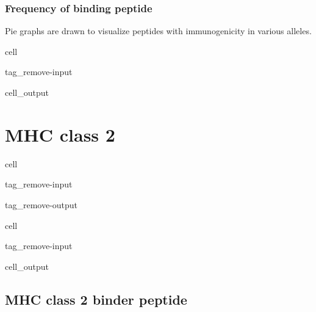 \documentclass[letterpaper,10pt,english]{jupyterBook}
\begin{document}
\subsubsection{Frequency of binding peptide}
\label{\detokenize{ipynb/chapter4:frequency-of-binding-peptide}}
\sphinxAtStartPar
Pie graphs are drawn to visualize peptides with immunogenicity in various alleles.

\begin{sphinxuseclass}{cell}
\begin{sphinxuseclass}{tag_remove-input}\begin{sphinxVerbatimOutput}

\begin{sphinxuseclass}{cell_output}
\noindent{}

\end{sphinxuseclass}\end{sphinxVerbatimOutput}

\end{sphinxuseclass}
\end{sphinxuseclass}

\section{MHC class 2}
\label{\detokenize{ipynb/chapter4:mhc-class-2}}
\begin{sphinxuseclass}{cell}
\begin{sphinxuseclass}{tag_remove-input}
\begin{sphinxuseclass}{tag_remove-output}
\end{sphinxuseclass}
\end{sphinxuseclass}
\end{sphinxuseclass}
\begin{sphinxuseclass}{cell}
\begin{sphinxuseclass}{tag_remove-input}\begin{sphinxVerbatimOutput}

\begin{sphinxuseclass}{cell_output}
\noindent{}

\end{sphinxuseclass}\end{sphinxVerbatimOutput}

\end{sphinxuseclass}
\end{sphinxuseclass}

\subsection{MHC class 2 binder peptide}
\label{\detokenize{ipynb/chapter4:mhc-class-2-binder-peptide}}
\end{document}
